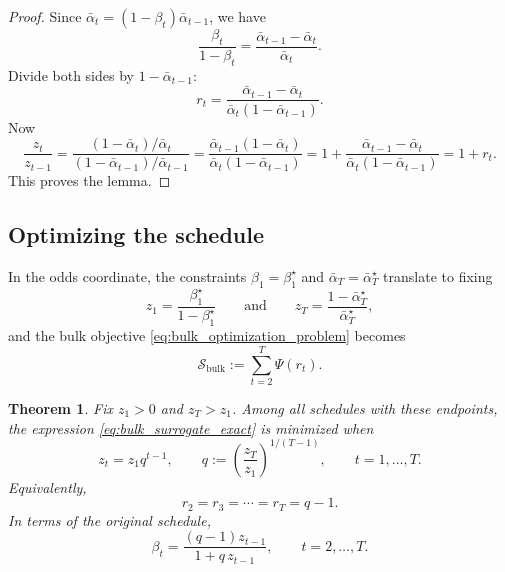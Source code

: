 \documentclass[11pt]{article}
\newcommand{\PsiFn}{\Psi}
\newtheorem{thm}{Theorem}
\begin{document}
\begin{proof}
Since \(\bar\alpha_t=(1-\beta_t)\bar\alpha_{t-1}\), we have
\[
\frac{\beta_t}{1-\beta_t}
=
\frac{\bar\alpha_{t-1}-\bar\alpha_t}{\bar\alpha_t}.
\]
Divide both sides by \(1-\bar\alpha_{t-1}\):
\[
r_t
=
\frac{\bar\alpha_{t-1}-\bar\alpha_t}{\bar\alpha_t(1-\bar\alpha_{t-1})}.
\]
Now
\[
\frac{z_t}{z_{t-1}}
=
\frac{(1-\bar\alpha_t)/\bar\alpha_t}{(1-\bar\alpha_{t-1})/\bar\alpha_{t-1}}
=
\frac{\bar\alpha_{t-1}(1-\bar\alpha_t)}{\bar\alpha_t(1-\bar\alpha_{t-1})}
=
1+
\frac{\bar\alpha_{t-1}-\bar\alpha_t}{\bar\alpha_t(1-\bar\alpha_{t-1})}
=
1+r_t.
\]
This proves the lemma.
\end{proof}

\subsection{Optimizing the schedule}

In the odds coordinate, the constraints \(\beta_1 = \beta_1^\star\) and \(\bar\alpha_T = \bar\alpha_T^\star\) translate to fixing
\[
z_1 = \frac{\beta_1^\star}{1-\beta_1^\star}
\qquad\text{and}\qquad
z_T = \frac{1-\bar\alpha_T^\star}{\bar\alpha_T^\star},
\]
and the bulk objective \eqref{eq:bulk_optimization_problem} becomes
\begin{equation}
\label{eq:bulk_surrogate_exact}
\mathcal S_{\mathrm{bulk}}
:=
\sum_{t=2}^T \PsiFn(r_t).
\end{equation}

\begin{thm}
\label{thm:exact_bulk_optimization}
Fix \(z_1>0\) and \(z_T>z_1\). Among all schedules with these endpoints, the expression \eqref{eq:bulk_surrogate_exact} is minimized when
\begin{equation}
\label{eq:geometric_z_optimal}
z_t = z_1 q^{t-1},
\qquad
q:=\left(\frac{z_T}{z_1}\right)^{1/(T-1)},
\qquad t=1,\dots,T.
\end{equation}
Equivalently,
\[
r_2 = r_3 = \cdots = r_T = q-1.
\]
In terms of the original schedule,
\begin{equation}
\label{eq:beta_from_q}
\beta_t
=
\frac{(q-1)z_{t-1}}{1+q\,z_{t-1}},
\qquad t=2,\dots,T.
\end{equation}
\end{thm}
\end{document}

